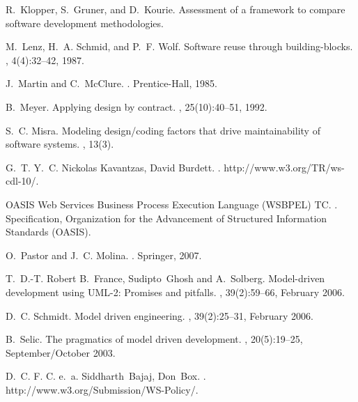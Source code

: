 \documentclass[reviewcopy]{elsart}
\begin{document}
\begin{thebibliography}{10}
R.~Klopper, S.~Gruner, and D.~Kourie.
\newblock Assessment of a framework to compare software development
  methodologies.

M.~Lenz, H.~A. Schmid, and P.~F. Wolf.
\newblock Software reuse through building-blocks.
, 4(4):32--42, 1987.

J.~Martin and C.~McClure.
.
\newblock Prentice-Hall, 1985.

B.~Meyer.
\newblock Applying design by contract.
, 25(10):40--51, 1992.

S.~C. Misra.
\newblock Modeling design/coding factors that drive maintainability of software
  systems.
, 13(3).

G.~T. Y.~C. {Nickolas Kavantzas}, {David Burdett}.
.
\newblock http://www.w3.org/TR/ws-cdl-10/.

{OASIS Web Services Business Process Execution Language (WSBPEL) TC}.
.
\newblock Specification, Organization for the Advancement of Structured
  Information Standards (OASIS).

O.~Pastor and J.~C. Molina.
.
\newblock Springer, 2007.

T.~D.-T. Robert B.~France, Sudipto~Ghosh and A.~Solberg.
\newblock Model-driven development using {UML}-2: Promises and pitfalls.
, 39(2):59--66, February 2006.

D.~C. Schmidt.
\newblock Model driven engineering.
, 39(2):25--31, February 2006.

B.~Selic.
\newblock The pragmatics of model driven development.
, 20(5):19--25, September/October 2003.

D.~C. F. C. e.~a. Siddharth~Bajaj, Don~Box.
.
\newblock http://www.w3.org/Submission/WS-Policy/.


\end{thebibliography}
\end{document}
